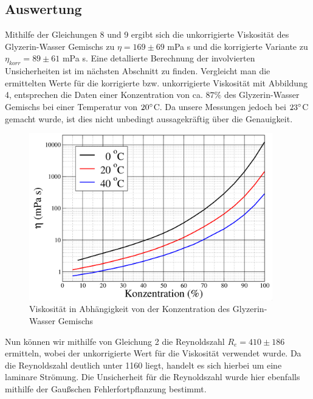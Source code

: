\documentclass{article}
\begin{document}
\subsection{Auswertung}
Mithilfe der Gleichungen 8 und 9 ergibt sich die unkorrigierte Viskosität des Glyzerin-Wasser Gemischs zu $\eta = 169 \pm 69$ mPa s und die korrigierte Variante zu $\eta_{korr} = 89 \pm 61$ mPa s. Eine detallierte Berechnung der involvierten Unsicherheiten ist im nächsten Abschnitt zu finden.
Vergleicht man die ermittelten Werte für die korrigierte bzw. unkorrigierte Viskosität mit Abbildung 4, entsprechen die Daten einer Konzentration von ca. $87\%$ des Glyzerin-Wasser Gemischs bei einer Temperatur von $20\degree$C. Da unsere Messungen jedoch bei $23 \degree$C gemacht wurde, ist dies nicht unbedingt aussagekräftig über die Genauigkeit.
\begin{figure}[H]
\centering
\includegraphics[width=300pt]{vis-konzentration.png}
\caption{Viskosität in Abhängigkeit von der Konzentration des Glyzerin-Wasser Gemischs \cite{1}}
\label{fig:length_eight_mouse}
\end{figure}
\noindent
Nun können wir mithilfe von Gleichung 2 die Reynoldszahl $R_e = 410 \pm 186$ ermitteln, wobei der unkorrigierte Wert für die Viskosität verwendet wurde. Da die Reynoldszahl deutlich unter 1160 liegt, handelt es sich hierbei um eine laminare Strömung. Die Unsicherheit für die Reynoldszahl wurde hier ebenfalls mithilfe der Gaußschen Fehlerfortpflanzung bestimmt.
\end{document}
